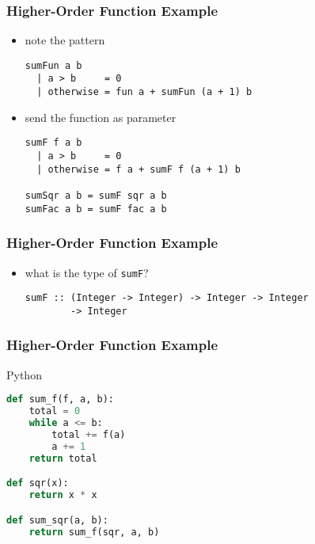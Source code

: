 \documentclass[dvipsnames]{beamer}
\theoremstyle{plain}
\begin{document}
\begin{frame}[fragile]
  \frametitle{Higher-Order Function Example}

  \begin{exampleblock}{}
    \begin{itemize}
      \item note the pattern

      \smallskip
      \begin{lstlisting}
sumFun a b
  | a > b     = 0
  | otherwise = fun a + sumFun (a + 1) b
      \end{lstlisting}
    \end{itemize}
  \end{exampleblock}

  \pause
  \begin{exampleblock}{}
    \begin{itemize}
      \item send the function as parameter

      \smallskip
      \begin{lstlisting}
sumF f a b
  | a > b     = 0
  | otherwise = f a + sumF f (a + 1) b

sumSqr a b = sumF sqr a b
sumFac a b = sumF fac a b
      \end{lstlisting}
    \end{itemize}
  \end{exampleblock}
\end{frame}

\begin{frame}[fragile]
  \frametitle{Higher-Order Function Example}

  \begin{exampleblock}{}
    \begin{itemize}
      \item what is the type of \lstinline|sumF|?

      \smallskip
      \begin{lstlisting}
sumF :: (Integer -> Integer) -> Integer -> Integer
        -> Integer
      \end{lstlisting}
    \end{itemize}
  \end{exampleblock}
\end{frame}

\begin{frame}[fragile]
  \frametitle{Higher-Order Function Example}

  \begin{exampleblock}{Python}
    \begin{lstlisting}[language=Python]
def sum_f(f, a, b):
    total = 0
    while a <= b:
        total += f(a)
        a += 1
    return total

def sqr(x):
    return x * x

def sum_sqr(a, b):
    return sum_f(sqr, a, b)
    \end{lstlisting}
  \end{exampleblock}
\end{frame}
\end{document}
